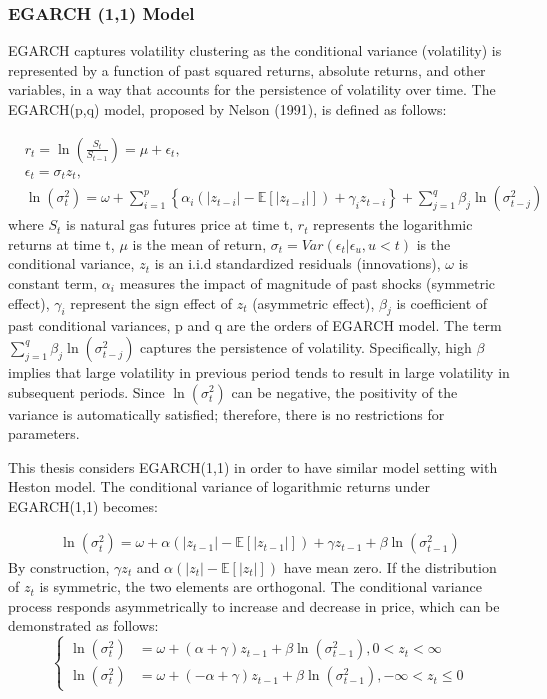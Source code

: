 \documentclass[12pt,a4paper]{article}
\numberwithin{equation}{section}
\begin{document}
\subsubsection{EGARCH (1,1) Model}

EGARCH captures volatility clustering as the conditional variance (volatility) is represented by a function of past squared returns, absolute returns, and other variables, in a way that accounts for the persistence of volatility over time. The EGARCH(p,q) model, proposed by Nelson (1991), is defined as follows:

 \begin{align*}
 &r_t = \ln \left(\frac{S_t}{S_{t-1}}\right) = \mu + \epsilon_t ,\\[0.6em]
 &\epsilon_t = \sigma_t z_t,\\[0.6em]
 &\ln\left(\sigma_t^2\right) = \omega + \sum_{i=1}^p \left\{ \alpha_i \left( |z_{t-i}| - \mathbb{E}[|z_{t-i}|] \right) + \gamma_i z_{t-i} \right\} + \sum_{j=1}^q \beta_j \ln\left(\sigma_{t-j}^2\right)
 \end{align*}
 where $S_t$ is natural gas futures price at time t,  $r_t$ represents the logarithmic returns at time t, $\mu$ is the mean of return, $\sigma_t = Var(\epsilon_t|\epsilon_u, u<t)$ is the conditional variance, $z_t$ is an i.i.d standardized residuals (innovations), $\omega$ is constant term, $\alpha_i$ measures the impact of magnitude of past shocks (symmetric effect), $\gamma_i$ represent the sign effect of $z_t$ (asymmetric effect), $\beta_j$ is coefficient of past conditional variances, p and q are the orders of EGARCH model. The term $\sum_{j=1}^q \beta_j \ln\left(\sigma_{t-j}^2\right)$ captures the persistence of volatility. Specifically, high $\beta$ implies that large volatility in previous period tends to result in large volatility in subsequent periods. Since $\ln(\sigma_t^2)$ can be negative, the positivity of the variance is automatically satisfied; therefore, there is no restrictions for parameters.
 
 This thesis considers EGARCH(1,1) in order to have similar model setting with Heston model. The conditional variance of logarithmic returns under EGARCH(1,1) becomes:
 
  \begin{align*}
  \ln\left(\sigma_t^2\right) = \omega + \alpha \left( |z_{t-1}| - \mathbb{E}[|z_{t-1}|] \right) + \gamma z_{t-1} +  \beta \ln\left(\sigma_{t-1}^2\right)
 \end{align*}
By construction, $\gamma z_t$ and $\alpha (|z_t| - \mathbb{E}[|z_t|])$ have mean zero. If the distribution of $z_t$ is symmetric, the two elements are orthogonal. The conditional variance process responds asymmetrically to increase and decrease in price, which can be demonstrated as follows: 
 \begin{equation}
 \begin{cases}
 \ln\left(\sigma_t^2\right) &= \omega + (\alpha + \gamma) z_{t-1} +  \beta \ln\left(\sigma_{t-1}^2\right), 0 < z_t < \infty \\[0.6em]
 \ln\left(\sigma_t^2\right) &= \omega + (-\alpha + \gamma) z_{t-1} +  \beta \ln\left(\sigma_{t-1}^2\right), -\infty < z_t \le 0
 \end{cases}
 \end{equation}
\end{document}

